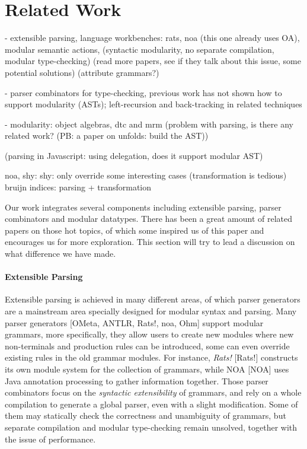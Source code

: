\section{Related Work}\label{sec:relatedwork}

- extensible parsing, language workbenches: rats, noa (this one already uses OA), modular semantic actions, (syntactic modularity, no separate compilation, modular type-checking)
(read more papers, see if they talk about this issue, some potential solutions)
(attribute grammars?)

- parser combinators for type-checking, previous work has not shown how to support modularity (ASTs); left-recursion and back-tracking in related techniques

- modularity: object algebras, dtc and mrm (problem with parsing, is there any related work? (PB: a paper on unfolds: build the AST))

(parsing in Javascript: using delegation, does it support modular AST)

noa, shy: shy: only override some interesting cases (transformation is tedious)
bruijn indices: parsing + transformation

Our work integrates several components including extensible parsing, parser combinators and modular datatypes. There has been a great amount of related papers
on those hot topics, of which some inspired us of this paper and encourages us for more exploration. This section will try to lead a discussion on what difference we have made.

\paragraph*{Extensible Parsing} Extensible parsing is achieved in many different areas, of which parser generators are a mainstream area specially designed for modular syntax and parsing. Many parser generators [OMeta, ANTLR, Rats!, noa, Ohm]  support modular grammars, more specifically, they allow users to create new modules where new non-terminals and production rules can be introduced, some can even override existing rules in the old grammar modules. For instance, \textit{Rats!} [Rats!]
constructs its own module system for the collection of grammars, while NOA [NOA] uses Java annotation processing to gather information together. Those parser combinators focus on the \textit{syntactic extensibility} of grammars, and rely on a whole compilation to generate a global parser, even with a slight modification. Some of them may statically check the correctness and unambiguity of grammars, but separate compilation and modular type-checking remain unsolved, together with the issue of performance.

